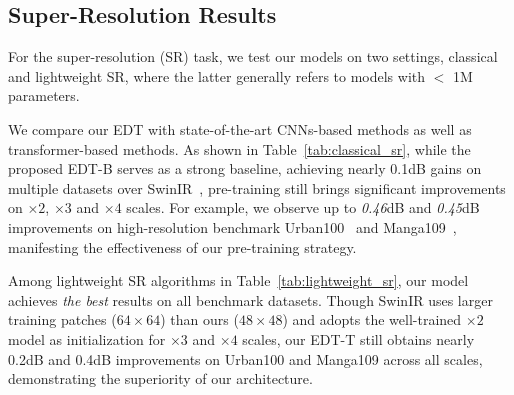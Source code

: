 \documentclass[runningheads]{llncs}
\begin{document}
	\vspace{-0.1in}
	\subsection{Super-Resolution Results}
	
	For the super-resolution (SR) task, we test our models on two settings, classical and lightweight SR, where the latter generally refers to models with $<$ 1M parameters.
	
	\vspace{0.05in}
	 We compare our EDT with state-of-the-art CNNs-based methods as well as transformer-based methods. As shown in Table~\ref{tab:classical_sr}, while the proposed EDT-B serves as a strong baseline, achieving nearly 0.1dB gains on multiple datasets over SwinIR~\cite{liang2021swinir}, pre-training still brings significant improvements on $\times 2$, $\times 3$ and $\times 4$ scales. For example, we observe up to \textit{0.46}dB and \textit{0.45}dB improvements on high-resolution benchmark Urban100~\cite{huang2015single} and Manga109~\cite{matsui2017sketch}, manifesting the effectiveness of our pre-training strategy. 
	
	\vspace{0.05in}
	 Among lightweight SR algorithms in Table~\ref{tab:lightweight_sr}, our model achieves \textit{the best} results on all benchmark datasets. Though SwinIR uses larger training patches ($64 \times 64$) than ours ($48 \times 48$) and adopts the well-trained $\times 2$ model as initialization for $\times 3$ and $\times 4$ scales, our EDT-T still obtains nearly 0.2dB and 0.4dB improvements on Urban100 and Manga109 across all scales, demonstrating the superiority of our architecture.
	
	
	
\end{document}
